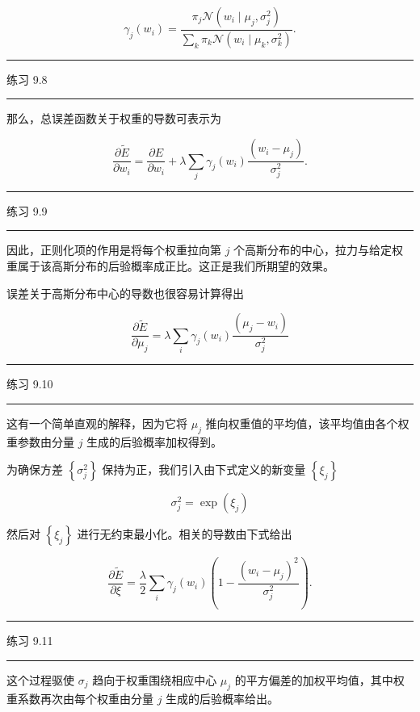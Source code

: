 \documentclass[10pt]{report}
\newcommand{\HRule}{\begin{center}\rule{0.9\linewidth}{0.2mm}\end{center}}
\begin{document}
\[
{\gamma }_{j}\left( {w}_{i}\right)  = \frac{{\pi }_{j}\mathcal{N}\left( {{w}_{i} \mid  {\mu }_{j},{\sigma }_{j}^{2}}\right) }{\mathop{\sum }\limits_{k}{\pi }_{k}\mathcal{N}\left( {{w}_{i} \mid  {\mu }_{k},{\sigma }_{k}^{2}}\right) }. \tag{9.24}
\]

\HRule

练习 9.8

\HRule

那么，总误差函数关于权重的导数可表示为

\[
\frac{\partial \widetilde{E}}{\partial {w}_{i}} = \frac{\partial E}{\partial {w}_{i}} + \lambda \mathop{\sum }\limits_{j}{\gamma }_{j}\left( {w}_{i}\right) \frac{\left( {w}_{i} - {\mu }_{j}\right) }{{\sigma }_{j}^{2}}. \tag{9.25}
\]

\HRule

练习 9.9

\HRule

因此，正则化项的作用是将每个权重拉向第 \(j\) 个高斯分布的中心，拉力与给定权重属于该高斯分布的后验概率成正比。这正是我们所期望的效果。

误差关于高斯分布中心的导数也很容易计算得出

\[
\frac{\partial \widetilde{E}}{\partial {\mu }_{j}} = \lambda \mathop{\sum }\limits_{i}{\gamma }_{j}\left( {w}_{i}\right) \frac{\left( {\mu }_{j} - {w}_{i}\right) }{{\sigma }_{j}^{2}} \tag{9.26}
\]

\HRule

练习 9.10

\HRule

这有一个简单直观的解释，因为它将 \({\mu }_{j}\) 推向权重值的平均值，该平均值由各个权重参数由分量 \(j\) 生成的后验概率加权得到。

为确保方差 \(\left\{  {\sigma }_{j}^{2}\right\}\) 保持为正，我们引入由下式定义的新变量 \(\left\{  {\xi }_{j}\right\}\)

\[
{\sigma }_{j}^{2} = \exp \left( {\xi }_{j}\right)  \tag{9.27}
\]

然后对 \(\left\{  {\xi }_{j}\right\}\) 进行无约束最小化。相关的导数由下式给出

\[
\frac{\partial \widetilde{E}}{\partial \xi } = \frac{\lambda }{2}\mathop{\sum }\limits_{i}{\gamma }_{j}\left( {w}_{i}\right) \left( {1 - \frac{{\left( {w}_{i} - {\mu }_{j}\right) }^{2}}{{\sigma }_{j}^{2}}}\right) . \tag{9.28}
\]

\HRule

练习 9.11

\HRule

这个过程驱使 \({\sigma }_{j}\) 趋向于权重围绕相应中心 \({\mu }_{j}\) 的平方偏差的加权平均值，其中权重系数再次由每个权重由分量 \(j\) 生成的后验概率给出。
\end{document}
